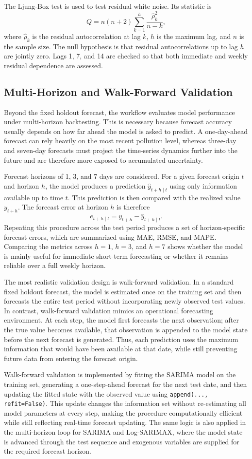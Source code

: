 \documentclass[11pt]{article}
\newcommand{\subheading}[1]{%
  \phantomsection%
  \subsection*{#1}%
  \addcontentsline{toc}{subsection}{#1}%
}
\begin{document}
The Ljung-Box test is used to test residual white noise. Its statistic is
\[
Q=n(n+2)\sum_{k=1}^{h}\frac{\hat{\rho}_k^2}{n-k},
\]
where $\hat{\rho}_k$ is the residual autocorrelation at lag $k$, $h$ is the maximum lag, and $n$ is the sample size. The null hypothesis is that residual autocorrelations up to lag $h$ are jointly zero. Lags 1, 7, and 14 are checked so that both immediate and weekly residual dependence are assessed.

\subheading{Multi-Horizon and Walk-Forward Validation}
Beyond the fixed holdout forecast, the workflow evaluates model performance under multi-horizon backtesting. This is necessary because forecast accuracy usually depends on how far ahead the model is asked to predict. A one-day-ahead forecast can rely heavily on the most recent pollution level, whereas three-day and seven-day forecasts must project the time-series dynamics further into the future and are therefore more exposed to accumulated uncertainty.

Forecast horizons of 1, 3, and 7 days are considered. For a given forecast origin $t$ and horizon $h$, the model produces a prediction $\hat{y}_{t+h\mid t}$ using only information available up to time $t$. This prediction is then compared with the realized value $y_{t+h}$. The forecast error at horizon $h$ is therefore
\[
e_{t+h\mid t}=y_{t+h}-\hat{y}_{t+h\mid t}.
\]
Repeating this procedure across the test period produces a set of horizon-specific forecast errors, which are summarized using MAE, RMSE, and MAPE. Comparing the metrics across $h=1$, $h=3$, and $h=7$ shows whether the model is mainly useful for immediate short-term forecasting or whether it remains reliable over a full weekly horizon.

The most realistic validation design is walk-forward validation. In a standard fixed holdout forecast, the model is estimated once on the training set and then forecasts the entire test period without incorporating newly observed test values. In contrast, walk-forward validation mimics an operational forecasting environment. At each step, the model first forecasts the next observation; after the true value becomes available, that observation is appended to the model state before the next forecast is generated. Thus, each prediction uses the maximum information that would have been available at that date, while still preventing future data from entering the forecast origin.

Walk-forward validation is implemented by fitting the SARIMA model on the training set, generating a one-step-ahead forecast for the next test date, and then updating the fitted state with the observed value using \texttt{append(..., refit=False)}. This update changes the information set without re-estimating all model parameters at every step, making the procedure computationally efficient while still reflecting real-time forecast updating. The same logic is also applied in the multi-horizon loop for SARIMA and Log-SARIMAX, where the model state is advanced through the test sequence and exogenous variables are supplied for the required forecast horizon.
\end{document}
